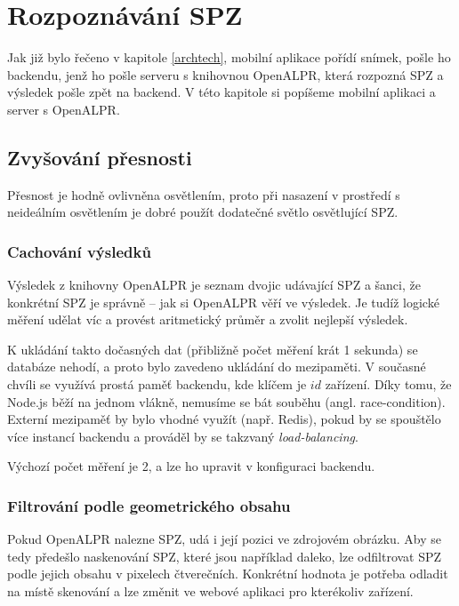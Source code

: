
\chapter{Rozpoznávání SPZ}

\noindent
Jak již bylo řečeno v kapitole \ref{archtech}, mobilní aplikace pořídí snímek,
pošle ho backendu, jenž ho pošle serveru s knihovnou OpenALPR, která
rozpozná SPZ a výsledek pošle zpět na backend. V této kapitole si popíšeme
mobilní aplikaci a server s OpenALPR.

\section{Zvyšování přesnosti} \label{reco_params}

\noindent
Přesnost je hodně ovlivněna osvětlením, proto při nasazení v prostředí s neideálním
osvětlením je dobré použít dodatečné světlo osvětlující SPZ.

\subsection{Cachování výsledků}

\noindent
Výsledek z knihovny OpenALPR je seznam dvojic udávající SPZ a šanci, že konkrétní SPZ je správně --
jak si OpenALPR věří ve výsledek. Je tudíž logické měření udělat víc a provést aritmetický průměr a
zvolit nejlepší výsledek.

K ukládání takto dočasných dat (přibližně počet měření krát 1 sekunda) se databáze nehodí, a proto
bylo zavedeno ukládání do mezipaměti. V současné chvíli se využívá prostá paměť backendu,
kde klíčem je $id$ zařízení. Díky tomu, že Node.js běží na jednom vlákně, nemusíme se bát souběhu
(angl. race-condition). Externí mezipaměť by bylo vhodné využít (např. Redis), pokud by se spouštělo více
instancí backendu a prováděl by se takzvaný \textit{load-balancing}.

Výchozí počet měření je 2, a lze ho upravit v konfiguraci backendu.

\subsection{Filtrování podle geometrického obsahu}

\noindent
Pokud OpenALPR nalezne SPZ, udá i její pozici ve zdrojovém obrázku.
Aby se tedy předešlo naskenování SPZ, které jsou například daleko, lze odfiltrovat SPZ
podle jejich obsahu v pixelech čtverečních. Konkrétní hodnota je potřeba odladit na místě skenování a
lze změnit ve webové aplikaci pro kterékoliv zařízení.


